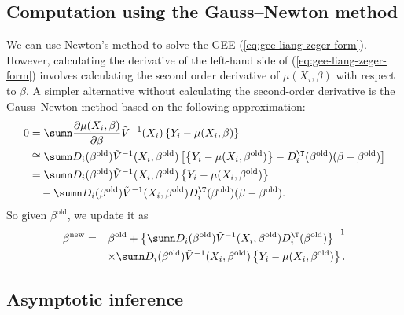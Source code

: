 \subsection{Computation using the Gauss--Newton method\label{subsec:Computation-gee-gauss-newton}}

We can use Newton's method to solve the GEE (\ref{eq:gee-liang-zeger-form}).
However, calculating the derivative of the left-hand side of (\ref{eq:gee-liang-zeger-form})
involves calculating the second order derivative of $ \mu (X_{i},\beta)$ with respect to $\beta$.
A simpler alternative without calculating the second-order derivative
is the Gauss--Newton method based on the following approximation:
\begin{align*}
0 & =\sumn\frac{\partial\mu (X_{i},\beta)}{\partial\beta}\tilde{V}^{-1}(X_{i})\left\{ Y_{i}-\mu(X_{i},\beta)\right\} \\
 & \cong \sumn D_{i} (\beta^{\text{old}})\tilde{V}^{-1}(X_{i}, \beta^{\text{old}})\left[\left\{ Y_{i}-\mu(X_{i},\beta^{\text{old}})\right\} -D_{i}^{\T}(\beta^{\text{old}})(\beta-\beta^{\text{old}})\right]\\
 & =\sumn D_{i} (\beta^{\text{old}})\tilde{V}^{-1}(X_{i}, \beta^{\text{old}})\left\{ Y_{i}-\mu(X_{i},\beta^{\text{old}})\right\} \\
 & \quad -\sumn D_{i} (\beta^{\text{old}})\tilde{V}^{-1}(X_{i}, \beta^{\text{old}})D_{i}^{\T}(\beta^{\text{old}})(\beta-\beta^{\text{old}}) . 
\end{align*}
So given $\beta^{\text{old}}$, we update it as
\begin{eqnarray}
\beta^{\text{new}} &=& \beta^{\text{old}}
+\left\{ \sumn D_{i} (\beta^{\text{old}})\tilde{V}^{-1}(X_{i}, \beta^{\text{old}})D_{i}^{\T}(\beta^{\text{old}})\right\} ^{-1} \nonumber \\
&& \times 
\sumn D_{i} (\beta^{\text{old}})\tilde{V}^{-1}(X_{i}, \beta^{\text{old}})\left\{ Y_{i}-\mu(X_{i},\beta^{\text{old}})\right\} . 
\label{eq::gauss-newton-gee}
\end{eqnarray}


\subsection{Asymptotic inference\label{subsec:Asymptotic-inference-GEE}}


